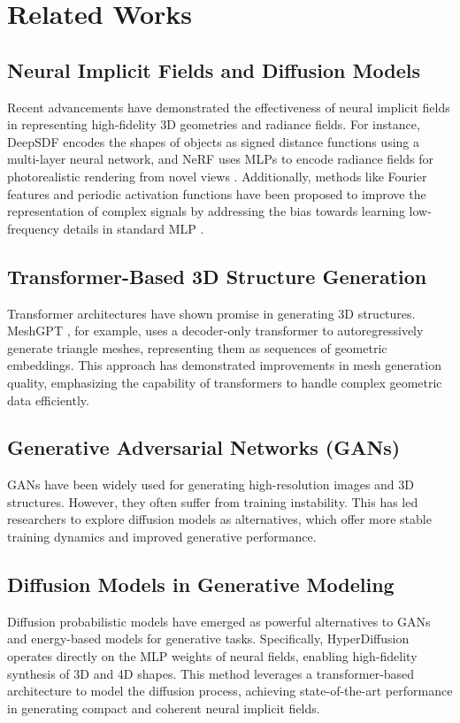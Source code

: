 \section{Related Works}
\label{sec:literature}

\subsection*{Neural Implicit Fields and Diffusion Models}
Recent advancements have demonstrated the effectiveness of neural implicit fields in representing high-fidelity 3D geometries and radiance fields. For instance, DeepSDF \cite{park2019deepsdflearningcontinuoussigned} encodes the shapes of objects as signed distance functions using a multi-layer neural network, and NeRF uses MLPs to encode radiance fields for photorealistic rendering from novel views \cite{mildenhall2020nerfrepresentingscenesneural}. Additionally, methods like Fourier features and periodic activation functions have been proposed to improve the representation of complex signals by addressing the bias towards learning low-frequency details in standard MLP \cite{tancik2020fourierfeaturesletnetworks, sitzmann2020implicitneuralrepresentationsperiodic}.


\subsection*{Transformer-Based 3D Structure Generation}
Transformer architectures have shown promise in generating 3D structures. MeshGPT \cite{siddiqui2023meshgpt}, for example, uses a decoder-only transformer to autoregressively generate triangle meshes, representing them as sequences of geometric embeddings. This approach has demonstrated improvements in mesh generation quality, emphasizing the capability of transformers to handle complex geometric data efficiently.


\subsection*{Generative Adversarial Networks (GANs)}
GANs \cite{goodfellow2014generativeadversarialnetworks} have been widely used for generating high-resolution images and 3D structures. However, they often suffer from training instability. This has led researchers to explore diffusion models as alternatives, which offer more stable training dynamics and improved generative performance.


\subsection*{Diffusion Models in Generative Modeling}
Diffusion probabilistic models have emerged as powerful alternatives to GANs and energy-based models for generative tasks. Specifically, HyperDiffusion \cite{erkoç2023hyperdiffusion} operates directly on the MLP weights of neural fields, enabling high-fidelity synthesis of 3D and 4D shapes. This method leverages a transformer-based architecture to model the diffusion process, achieving state-of-the-art performance in generating compact and coherent neural implicit fields.
